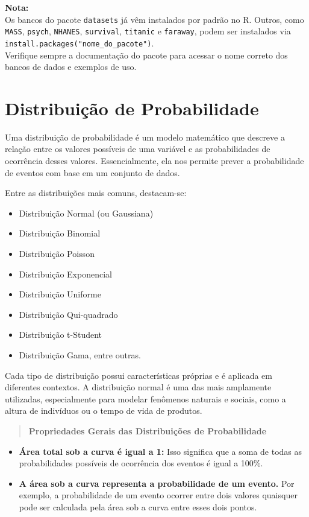 \documentclass[
]{book}
\providecommand{\tightlist}{%
  \setlength{\itemsep}{0pt}\setlength{\parskip}{0pt}}
\begin{document}
\textbf{Nota:}\\
Os bancos do pacote \texttt{datasets} já vêm instalados por padrão no R. Outros, como \texttt{MASS}, \texttt{psych}, \texttt{NHANES}, \texttt{survival}, \texttt{titanic} e \texttt{faraway}, podem ser instalados via \texttt{install.packages("nome\_do\_pacote")}.\\
Verifique sempre a documentação do pacote para acessar o nome correto dos bancos de dados e exemplos de uso.

\chapter{Distribuição de Probabilidade}\label{distribuiuxe7uxe3o-de-probabilidade}

Uma distribuição de probabilidade é um modelo matemático que descreve a relação entre os valores possíveis de uma variável e as probabilidades de ocorrência desses valores. Essencialmente, ela nos permite prever a probabilidade de eventos com base em um conjunto de dados.

Entre as distribuições mais comuns, destacam-se:

\begin{itemize}
\tightlist
\item
  Distribuição Normal (ou Gaussiana)
\item
  Distribuição Binomial
\item
  Distribuição Poisson
\item
  Distribuição Exponencial
\item
  Distribuição Uniforme
\item
  Distribuição Qui-quadrado
\item
  Distribuição t-Student
\item
  Distribuição Gama, entre outras.
\end{itemize}

Cada tipo de distribuição possui características próprias e é aplicada em diferentes contextos. A distribuição normal é uma das mais amplamente utilizadas, especialmente para modelar fenômenos naturais e sociais, como a altura de indivíduos ou o tempo de vida de produtos.

\begin{quote}
\textbf{Propriedades Gerais das Distribuições de Probabilidade}
\end{quote}

\begin{itemize}
\tightlist
\item
  \textbf{Área total sob a curva é igual a 1:} Isso significa que a soma de todas as probabilidades possíveis de ocorrência dos eventos é igual a 100\%.
\item
  \textbf{A área sob a curva representa a probabilidade de um evento.} Por exemplo, a probabilidade de um evento ocorrer entre dois valores quaisquer pode ser calculada pela área sob a curva entre esses dois pontos.
\end{itemize}
\end{document}
